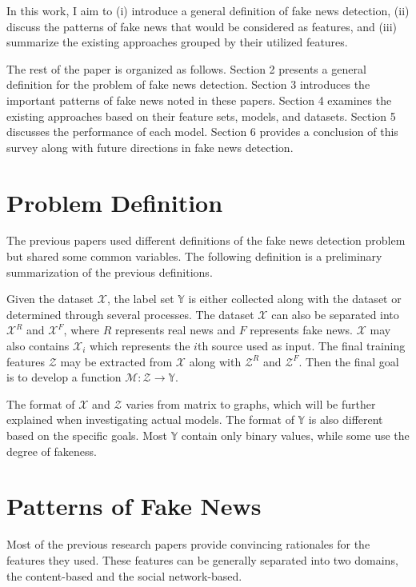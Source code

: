 \documentclass[sigconf ,nonacm]{acmart}
\begin{document}
In this work, I aim to (i) introduce a general definition of fake news detection, (ii) discuss the patterns of fake news that would be considered as features, and (iii) summarize the existing approaches grouped by their utilized features. 

The rest of the paper is organized as follows. Section 2 presents a general definition for the problem of fake news detection. Section 3 introduces the important patterns of fake news noted in these papers. Section 4 examines the existing approaches based on their feature sets, models, and datasets. Section 5 discusses the performance of each model. Section 6 provides a conclusion of this survey along with future directions in fake news detection.

\section{Problem Definition}
The previous papers used different definitions of the fake news detection problem but shared some common variables. The following definition is a preliminary summarization of the previous definitions.

Given the dataset $\mathcal{X}$, the label set $\mathbb{Y}$ is either collected along with the dataset or determined through several processes. The dataset $\mathcal{X}$ can also be separated into $\mathcal{X}^R$ and $\mathcal{X}^F$, where $R$ represents real news and $F$ represents fake news. $\mathcal{X}$ may also contains $\mathcal{X}_i$ which represents the $i$th source used as input. The final training features $\mathcal{Z}$ may be extracted from $\mathcal{X}$ along with $\mathcal{Z}^R$ and $\mathcal{Z}^F$. Then the final goal is to develop a function $\mathcal{M}:\mathcal{Z} \to \mathbb{Y}$.

The format of $\mathcal{X}$ and $\mathcal{Z}$ varies from matrix to graphs, which will be further explained when investigating actual models. The format of $\mathbb{Y}$ is also different based on the specific goals. Most $\mathbb{Y}$ contain only binary values, while some use the degree of fakeness.

\section{Patterns of Fake News}
Most of the previous research papers provide convincing rationales for the features they used. These features can be generally separated into two domains, the content-based and the social network-based.
\end{document}
